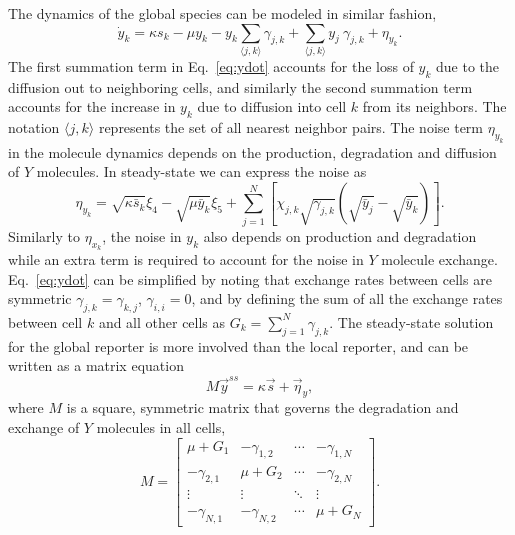 The dynamics of the global species can be modeled in similar fashion,
\begin{equation} \label{eq:ydot}
    \dot{y}_k = \kappa s_k - \mu y_k - y_k \sum_{\langle j,k \rangle} \gamma_{j,k} + \sum_{\langle j,k \rangle} y_j \ \gamma_{j,k} + \eta_{y_k} .
\end{equation}
The first summation term in Eq.\ \ref{eq:ydot} accounts for the loss of $y_k$ due to the diffusion out to neighboring cells, and similarly the second summation term accounts for the increase in $y_k$ due to diffusion into cell $k$ from its neighbors. The notation $\langle j,k \rangle$ represents the set of all nearest neighbor pairs. The noise term $\eta_{y_k}$ in the molecule dynamics depends on the production, degradation and diffusion of $Y$ molecules. In steady-state we can express the noise as
\begin{equation*}
    \eta_{y_k} = \sqrt{\kappa \bar{s}_k} \xi_4 - \sqrt{\mu\bar{y}_k} \xi_5 + \sum_{j=1}^N \left[ \chi_{j,k} \sqrt{\gamma_{j,k}} \left( \sqrt{\bar{y}_j}-\sqrt{\bar{y}_k} \right) \right] .
\end{equation*}
Similarly to $\eta_{x_k}$, the noise in $y_k$ also depends on production and degradation while an extra term is required to account for the noise in $Y$ molecule exchange. Eq.\ \ref{eq:ydot} can be simplified by noting that exchange rates between cells are symmetric $\gamma_{j,k}=\gamma_{k,j}$, $\gamma_{i,i}=0$, and by defining the sum of all the exchange rates between cell $k$ and all other cells as $G_k = \sum_{j=1}^N \gamma_{j,k}$. The steady-state solution for the global reporter is more involved than the local reporter, and can be written as a matrix equation
\begin{equation} \label{eq:yss}
    M\vec{y}^{ss} = \kappa\vec{s} + \vec{\eta}_y,
\end{equation}
where $M$ is a square, symmetric matrix that governs the degradation and exchange of $Y$ molecules in all cells,
\begin{equation} \label{eq:Mmatrix}
    M =
    \begin{bmatrix}
     \mu+G_1 & -\gamma_{1,2} & \cdots & -\gamma_{1,N} \\
     -\gamma_{2,1} & \mu+G_2 & \cdots & -\gamma_{2,N} \\
     \vdots  & \vdots  & \ddots & \vdots  \\
     -\gamma_{N,1} & -\gamma_{N,2} & \cdots & \mu+G_N
    \end{bmatrix}.
\end{equation}

